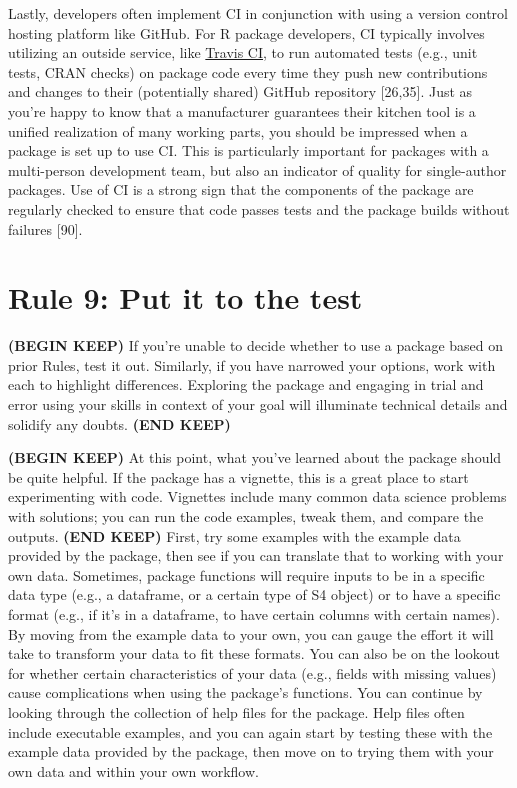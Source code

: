 \documentclass[10pt,letterpaper]{article}
\begin{document}
Lastly, developers often implement CI in conjunction with using a
version control hosting platform like GitHub. For R package developers,
CI typically involves utilizing an outside service, like
\href{https://travis-ci.org/}{Travis CI}, to run automated tests (e.g.,
unit tests, CRAN checks) on package code every time they push new
contributions and changes to their (potentially shared) GitHub
repository {[}26,35{]}. Just as you're happy to know that a manufacturer
guarantees their kitchen tool is a unified realization of many working
parts, you should be impressed when a package is set up to use CI. This
is particularly important for packages with a multi-person development
team, but also an indicator of quality for single-author packages. Use
of CI is a strong sign that the components of the package are regularly
checked to ensure that code passes tests and the package builds without
failures {[}90{]}.

\hypertarget{rule-9-put-it-to-the-test}{%
\section{Rule 9: Put it to the test}\label{rule-9-put-it-to-the-test}}

\textbf{(BEGIN KEEP)} If you're unable to decide whether to use a
package based on prior Rules, test it out. Similarly, if you have
narrowed your options, work with each to highlight differences.
Exploring the package and engaging in trial and error using your skills
in context of your goal will illuminate technical details and solidify
any doubts. \textbf{(END KEEP)}

\textbf{(BEGIN KEEP)} At this point, what you've learned about the
package should be quite helpful. If the package has a vignette, this is
a great place to start experimenting with code. Vignettes include many
common data science problems with solutions; you can run the code
examples, tweak them, and compare the outputs. \textbf{(END KEEP)}
First, try some examples with the example data provided by the package,
then see if you can translate that to working with your own data.
Sometimes, package functions will require inputs to be in a specific
data type (e.g., a dataframe, or a certain type of S4 object) or to have
a specific format (e.g., if it's in a dataframe, to have certain columns
with certain names). By moving from the example data to your own, you
can gauge the effort it will take to transform your data to fit these
formats. You can also be on the lookout for whether certain
characteristics of your data (e.g., fields with missing values) cause
complications when using the package's functions. You can continue by
looking through the collection of help files for the package. Help files
often include executable examples, and you can again start by testing
these with the example data provided by the package, then move on to
trying them with your own data and within your own workflow.
\end{document}
